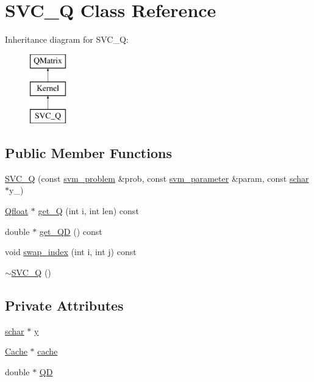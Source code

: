 \hypertarget{classSVC__Q}{}\section{S\+V\+C\+\_\+Q Class Reference}
\label{classSVC__Q}
Inheritance diagram for S\+V\+C\+\_\+Q\+:\begin{figure}[H]
\begin{center}
\leavevmode
\includegraphics[height=3.000000cm]{classSVC__Q}
\end{center}
\end{figure}
\subsection*{Public Member Functions}
\begin{DoxyCompactItemize}
\item 
\hyperlink{classSVC__Q_a23d7cf0b0606ccf2cb987205b94dddc7}{S\+V\+C\+\_\+Q} (const \hyperlink{structsvm__problem}{svm\+\_\+problem} \&prob, const \hyperlink{structsvm__parameter}{svm\+\_\+parameter} \&param, const \hyperlink{svm__core_8cpp_a0fd9ce9d735064461bebfe6037026093}{schar} $\ast$y\+\_\+)
\item 
\hyperlink{svm__core_8cpp_a8755d90a54ecfb8d15051af3e0542592}{Qfloat} $\ast$ \hyperlink{classSVC__Q_a9341b6030b3fdc88466e4a602b5abff0}{get\+\_\+Q} (int i, int len) const 
\item 
double $\ast$ \hyperlink{classSVC__Q_ac73020a6e438e209d63223e1fa8cac29}{get\+\_\+\+QD} () const 
\item 
void \hyperlink{classSVC__Q_a9c889db8ee0156ed5bcdaa4d6bc4e245}{swap\+\_\+index} (int i, int j) const 
\item 
\hyperlink{classSVC__Q_af491500a4a6e2df46083098ee3397142}{$\sim$\+S\+V\+C\+\_\+Q} ()
\end{DoxyCompactItemize}
\subsection*{Private Attributes}
\begin{DoxyCompactItemize}
\item 
\hyperlink{svm__core_8cpp_a0fd9ce9d735064461bebfe6037026093}{schar} $\ast$ \hyperlink{classSVC__Q_a6a37679890a665d32286a3ab047fc0f4}{y}
\item 
\hyperlink{classCache}{Cache} $\ast$ \hyperlink{classSVC__Q_a70e4787695cadf49495accdd36fb140f}{cache}
\item 
double $\ast$ \hyperlink{classSVC__Q_a635d129ea1d840296db2e8e1d4ada404}{QD}
\end{DoxyCompactItemize}

